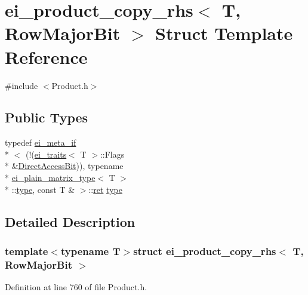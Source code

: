 \hypertarget{structei__product__copy__rhs_3_01_t_00_01_row_major_bit_01_4}{\section{ei\-\_\-product\-\_\-copy\-\_\-rhs$<$ T, Row\-Major\-Bit $>$ Struct Template Reference}
\label{structei__product__copy__rhs_3_01_t_00_01_row_major_bit_01_4}
}


{\ttfamily \#include $<$Product.\-h$>$}

\subsection*{Public Types}
\begin{DoxyCompactItemize}
\item 
typedef \hyperlink{structei__meta__if}{ei\-\_\-meta\-\_\-if}\\*
$<$ (!(\hyperlink{structei__traits}{ei\-\_\-traits}$<$ T $>$\-::Flags \\*
\&\hyperlink{group__flags_ga54c3b872f5a14e7e0d3d6539b704ea67}{Direct\-Access\-Bit})), typename \\*
\hyperlink{structei__plain__matrix__type}{ei\-\_\-plain\-\_\-matrix\-\_\-type}$<$ T $>$\\*
\-::\hyperlink{structei__product__copy__rhs_3_01_t_00_01_row_major_bit_01_4_a06f5fdf9714d811afdd723824febc8ee}{type}, const T \& $>$\-::\hyperlink{group___i_p_conn_plugin_gabc99fe6afec1a75ccff1092e47375a40}{ret} \hyperlink{structei__product__copy__rhs_3_01_t_00_01_row_major_bit_01_4_a06f5fdf9714d811afdd723824febc8ee}{type}
\end{DoxyCompactItemize}


\subsection{Detailed Description}
\subsubsection*{template$<$typename T$>$struct ei\-\_\-product\-\_\-copy\-\_\-rhs$<$ T, Row\-Major\-Bit $>$}



Definition at line 760 of file Product.\-h.



